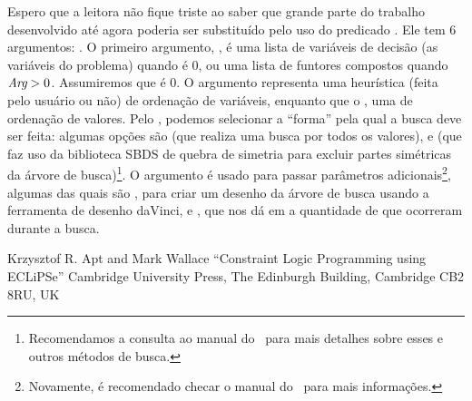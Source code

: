 \documentclass{article}
\begin{document}
Espero que a leitora não fique triste ao saber que grande parte do
trabalho desenvolvido até agora poderia ser substituído pelo uso do
predicado . Ele tem 6 argumentos:
. O primeiro argumento, , é uma lista de
variáveis de decisão (as variáveis do problema) quando  é 0,
ou uma lista de funtores compostos quando $\textit{Arg} > 0$. Assumiremos
que  é 0. O argumento  representa uma heurística
(feita pelo usuário ou não) de ordenação de variáveis, enquanto que o
, uma de ordenação de valores. Pelo , podemos
selecionar a ``forma'' pela qual a busca deve ser feita: algumas
opções são  (que realiza uma busca por todos os
valores), e  (que faz uso da biblioteca SBDS de quebra
de simetria para excluir partes simétricas da árvore de
busca)\footnote{Recomendamos a consulta ao manual do \eclipse\ para
  mais detalhes sobre esses e outros métodos de busca.}. O argumento
 é usado para passar parâmetros
adicionais\footnote{Novamente, é recomendado checar o manual do
  \eclipse\ para mais informações.}, algumas das quais são
, para criar um desenho da árvore de busca
usando a ferramenta de desenho daVinci, e ,
que nos dá em  a quantidade de  que
ocorreram durante a busca.


\begin{thebibliography}{2}

 Krzysztof R. Apt and Mark Wallace ``Constraint
  Logic Programming using ECLiPSe'' Cambridge University Press,
  The Edinburgh Building, Cambridge CB2 8RU, UK


\end{thebibliography}
\end{document}

